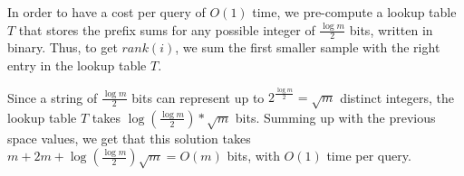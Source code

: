 \documentclass{article}
\begin{document}
In order to have a cost per query of $O(1)$ time, we pre-compute a lookup table $T$ that stores the prefix sums for any possible integer of $\frac{\log m}{2}$ bits, written in binary. Thus, to get $rank(i)$, we sum the first smaller sample with the right entry in the lookup table $T$.

Since a string of $\frac{\log m}{2}$ bits can represent up to $2^{\frac{\log m}{2}}=\sqrt m$ distinct integers, the lookup table $T$ takes $\log(\frac{\log m}{2})*\sqrt m$ bits. Summing up with the previous space values, we get that this solution takes $m+2m+\log (\frac{\log m}{2})\sqrt m=O(m)$ bits, with $O(1)$ time per query.
\end{document}
